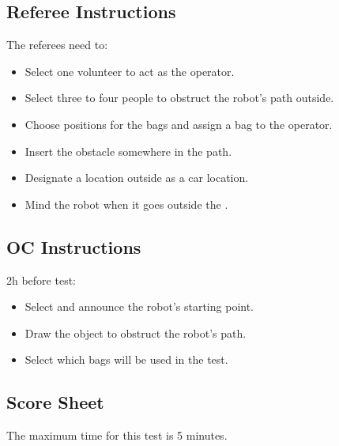 \subsection*{Referee Instructions}

The referees need to:
\begin{itemize}[nosep]
	\item Select one volunteer to act as the operator.
    \item Select three to four people to obstruct the robot's path outside.
	\item Choose positions for the bags and assign a bag to the operator.
    \item Insert the obstacle somewhere in the path.
	\item Designate a location outside as a car location.
	\item Mind the robot when it goes outside the \Arena{}.
\end{itemize}

\subsection*{OC Instructions}

2h before test:
\begin{itemize}[nosep]
	\item Select and announce the robot's starting point.
	\item Draw the object to obstruct the robot's path.
	\item Select which bags will be used in the test.
\end{itemize}

\subsection*{Score Sheet}

The maximum time for this test is 5 minutes.

